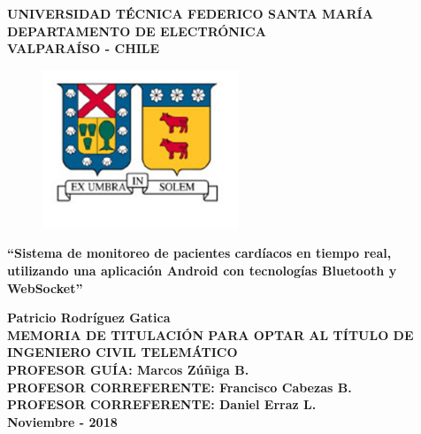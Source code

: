 \documentclass[12pt,spanish]{thesis}
\begin{document}
\thispagestyle{empty}

\begin{center}
\renewcommand{\baselinestretch}{1.15}
\textbf{\large{UNIVERSIDAD TÉCNICA FEDERICO SANTA MARÍA\\}
\normalsize{DEPARTAMENTO DE ELECTRÓNICA\\VALPARAÍSO - CHILE\\}}

\vspace{0.5cm}
\begin{figure}[H]
\centering
  \includegraphics[width=5.85cm]{figuras/usmLogo.png}
\end{figure}
\vspace{0.5cm}

\renewcommand{\baselinestretch}{1}
\hangindent=0cm
\textbf{\Large ``Sistema de monitoreo de pacientes cardíacos en tiempo real, utilizando una aplicación Android con tecnologías Bluetooth y WebSocket''\\}
\vspace{3cm}

\hangindent=0cm\large \textbf{Patricio Rodríguez Gatica}\\
\vspace{0.5cm}
\hangindent=0cm\normalsize \textbf{MEMORIA DE TITULACIÓN PARA OPTAR AL TÍTULO DE INGENIERO CIVIL TELEMÁTICO}\\

\vspace{1.5cm}
\hangindent=0cm\normalsize \textbf{PROFESOR GUÍA: \hspace{5cm} Marcos Zúñiga B.}\\

\vspace{0.5cm}
\hangindent=0cm\normalsize \textbf{PROFESOR CORREFERENTE: \hspace{2cm} Francisco Cabezas B.}\\

\vspace{0.5cm}
\hangindent=0cm\normalsize \textbf{PROFESOR CORREFERENTE: \hspace{3cm} Daniel Erraz L.}\\

\vspace{1.5cm}
\hangindent=0cm\normalsize \textbf{Noviembre - 2018}\\

\end{center}
\end{document}
